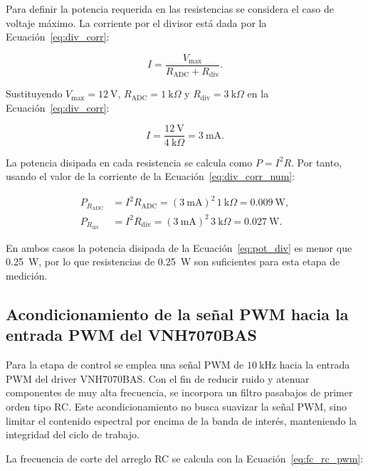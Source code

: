 Para definir la potencia requerida en las resistencias se considera el caso de voltaje máximo. La corriente por el divisor está dada por la Ecuación~\ref{eq:div_corr}:

\begin{equation}
I = \frac{V_{\max}}{R_{\mathrm{ADC}}+R_{\mathrm{div}}}.
\label{eq:div_corr}
\end{equation}

Sustituyendo \(V_{\max}=12~\mathrm{V}\), \(R_{\mathrm{ADC}}=1~\mathrm{k}\Omega\) y \(R_{\mathrm{div}}=3~\mathrm{k}\Omega\) en la Ecuación~\ref{eq:div_corr}:

\begin{equation}
I = \frac{12~\mathrm{V}}{4~\mathrm{k}\Omega}=3~\mathrm{mA}.
\label{eq:div_corr_num}
\end{equation}

La potencia disipada en cada resistencia se calcula como \(P=I^2R\). Por tanto, usando el valor de la corriente de la Ecuación~\ref{eq:div_corr_num}:

\begin{align}
P_{R_{\mathrm{ADC}}} &= I^2R_{\mathrm{ADC}} = (3~\mathrm{mA})^2\,1~\mathrm{k}\Omega
= 0.009~\mathrm{W}, \\
P_{R_{\mathrm{div}}} &= I^2R_{\mathrm{div}} = (3~\mathrm{mA})^2\,3~\mathrm{k}\Omega
= 0.027~\mathrm{W}.
\label{eq:pot_div}
\end{align}

En ambos casos la potencia disipada de la Ecuación~\ref{eq:pot_div} es menor que 0.25~W, por lo que resistencias de 0.25~W son suficientes para esta etapa de medición.

\subsection{Acondicionamiento de la señal PWM hacia la entrada PWM del VNH7070BAS}
\label{subsec:pwm_acond}

Para la etapa de control se emplea una señal \ac{PWM} de \(10~\mathrm{kHz}\) hacia la entrada PWM del driver VNH7070BAS. Con el fin de reducir ruido y atenuar componentes de muy alta frecuencia, se incorpora un filtro pasabajos de primer orden tipo RC. Este acondicionamiento no busca suavizar la señal \ac{PWM}, sino limitar el contenido espectral por encima de la banda de interés, manteniendo la integridad del ciclo de trabajo.

La frecuencia de corte del arreglo RC se calcula con la Ecuación~\ref{eq:fc_rc_pwm}:

